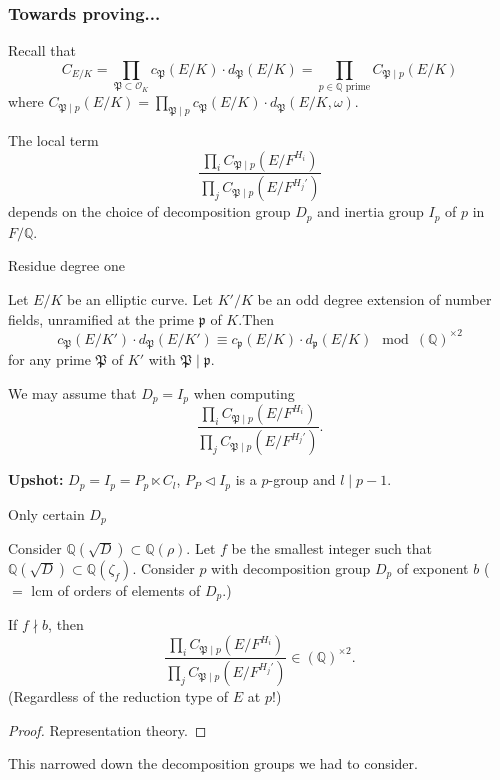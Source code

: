 \documentclass{beamer}
\newcommand{\bQ}{\mathbb{Q}}
\newcommand{\fP}{\mathfrak{P}}
\newcommand{\fp}{\mathfrak{p}}
\newcommand{\cO}{\mathcal{O}}
\theoremstyle{plain}
\begin{document}
\begin{frame}
    \frametitle{Towards proving...}
    Recall that 
    $$ C_{E / K} = \prod_{\fP \subset \cO_K} 
    c_{\fP}(E / K) \cdot d_{\fP}(E / K) = \prod_{p \in \bQ \text{ prime}} C_{\fP \mid p}(E / K)
    $$
    where $C_{\fP \mid p}(E / K) = \prod_{\fP \mid p} c_{\fP}(E / K) \cdot d_{\fP}(E / K, \omega)$.\pause 

    The local term $$\frac{\prod_i C_{\fP \mid p}(E / F^{H_i})}{\prod_j C_{\fP \mid p}(E / F^{H_j'})}$$ 
    depends on the choice of decomposition group $D_{p}$ and inertia group $I_{p}$ of $p$ in $F / \bQ$.
\end{frame}

%    

\begin{frame}{Residue degree one}
    
    \begin{lemma}
       Let $E / K$ be an elliptic curve. Let $K' / K$ be an odd degree extension of number fields, unramified at the prime $\fp$ of $K$.\pause Then 
       \[  c_{\fP}(E / K')\cdot d_{\fP}(E / K') \equiv c_{\fp}(E / K)\cdot d_{\fp}(E / K) \mod (\bQ)^{\times 2} \]
       for any prime $\fP$ of $K'$ with $\fP \mid \fp$.
    \end{lemma}\pause

    \begin{corollary}
        We may assume that $D_p = I_p$ when computing 
        $$\frac{\prod_i C_{\fP \mid p}(E / F^{H_i})}{\prod_j C_{\fP \mid p}(E / F^{H_j'})}.$$ 
    \end{corollary}\pause

    \textbf{Upshot:} $D_p = I_p = P_p \ltimes C_l$, $P_P \triangleleft I_p$ is a $p$-group and $l \mid p - 1$.  
\end{frame}

\begin{frame}{Only certain $D_p$}
    \begin{lemma}
        Consider $\bQ(\sqrt{D}) \subset \bQ(\rho)$. Let $f$ be the smallest integer such that $\bQ(\sqrt{D}) \subset \bQ(\zeta_{f})$. \pause 
        Consider $p$ with decomposition group $D_p$ of exponent $b$ ( $=$ lcm of orders of elements of $D_p$.) \pause 

        If $f \nmid b$, then 
        $$\frac{\prod_i C_{\fP \mid p}(E / F^{H_i})}{\prod_j C_{\fP \mid p}(E / F^{H_j'})} \in (\bQ)^{\times 2}.$$\pause (Regardless of the reduction type of $E$ at $p$!)
    \end{lemma}\pause

    \begin{proof}
        Representation theory. \pause
    \end{proof}
    
    This narrowed down the decomposition groups we had to consider. 
\end{frame}
\end{document}
